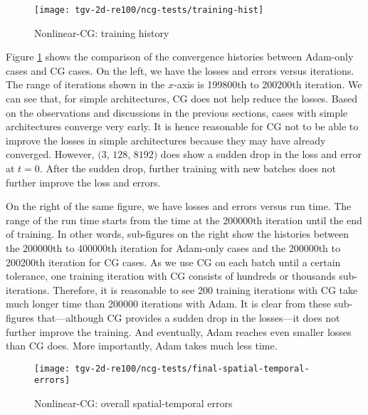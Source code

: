 \begin{figure}[hbt!]
    \centering%
    \texttt{[image: tgv-2d-re100/ncg-tests/training-hist]}%
    \caption[%
        Nonlinear-CG: training history%
    ]{%
        Nonlinear-CG: training history%
    }\label{fig:ncg-tests-train-hist}%
\end{figure}

Figure \ref{fig:ncg-tests-train-hist} shows the comparison of the convergence histories between Adam-only cases and CG cases.
On the left, we have the losses and errors versus iterations.
The range of iterations shown in the $x$-axis is \num{199800}th to \num{200200}th iteration.
We can see that, for simple architectures, CG does not help reduce the losses.
Based on the observations and discussions in the previous sections, cases with simple architectures converge very early.
It is hence reasonable for CG not to be able to improve the losses in simple architectures because they may have already converged.
However, $(3$, $128$, $8192)$ does show a sudden drop in the loss and error at $t=0$.
After the sudden drop, further training with new batches does not further improve the loss and errors.

On the right of the same figure, we have losses and errors versus run time.
The range of the run time starts from the time at the \num{200000}th iteration until the end of training.
In other words, sub-figures on the right show the histories between the \num{200000}th to \num{400000}th iteration for Adam-only cases and the \num{200000}th to \num{200200}th iteration for CG cases.
As we use CG on each batch until a certain tolerance, one training iteration with CG consists of hundreds or thousands sub-iterations.
Therefore, it is reasonable to see 200 training iterations with CG take much longer time than \num{200000} iterations with Adam.
It is clear from these sub-figures that---although CG provides a sudden drop in the losses---it does not further improve the training.
And eventually, Adam reaches even smaller losses than CG does.
More importantly, Adam takes much less time.

\begin{figure}[hbt!]
    \centering%
    \texttt{[image: tgv-2d-re100/ncg-tests/final-spatial-temporal-errors]}%
    \caption[%
        Nonlinear-CG: overall spatial-temporal errors%
    ]{%
        Nonlinear-CG: overall spatial-temporal errors%
    }\label{fig:ncg-tests-final-sterrs}%
\end{figure}

